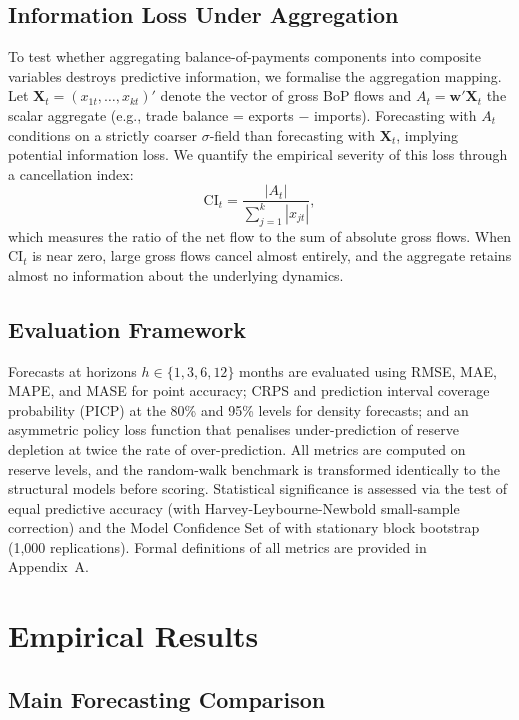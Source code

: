 \documentclass[12pt,a4paper]{article}
\begin{document}
\subsection{Information Loss Under Aggregation}

To test whether aggregating balance-of-payments components into composite variables destroys predictive information, we formalise the aggregation mapping. Let $\mathbf{X}_t = (x_{1t}, \ldots, x_{kt})'$ denote the vector of gross BoP flows and $A_t = \mathbf{w}'\mathbf{X}_t$ the scalar aggregate (e.g., trade balance = exports $-$ imports). Forecasting with $A_t$ conditions on a strictly coarser $\sigma$-field than forecasting with $\mathbf{X}_t$, implying potential information loss. We quantify the empirical severity of this loss through a cancellation index:
\[
\text{CI}_t = \frac{|A_t|}{\sum_{j=1}^{k} |x_{jt}|},
\]
which measures the ratio of the net flow to the sum of absolute gross flows. When $\text{CI}_t$ is near zero, large gross flows cancel almost entirely, and the aggregate retains almost no information about the underlying dynamics.

\subsection{Evaluation Framework}

Forecasts at horizons $h \in \{1, 3, 6, 12\}$ months are evaluated using RMSE, MAE, MAPE, and MASE \citep{HyndmanKoehler2006} for point accuracy; CRPS and prediction interval coverage probability (PICP) at the 80\% and 95\% levels for density forecasts; and an asymmetric policy loss function that penalises under-prediction of reserve depletion at twice the rate of over-prediction. All metrics are computed on reserve levels, and the random-walk benchmark is transformed identically to the structural models before scoring. Statistical significance is assessed via the \cite{DieboldMariano1995} test of equal predictive accuracy (with Harvey-Leybourne-Newbold small-sample correction) and the Model Confidence Set of \cite{HansenLundeNason2011} with stationary block bootstrap (1,000 replications). Formal definitions of all metrics are provided in Appendix~A.

\section{Empirical Results}

\subsection{Main Forecasting Comparison}
\end{document}

